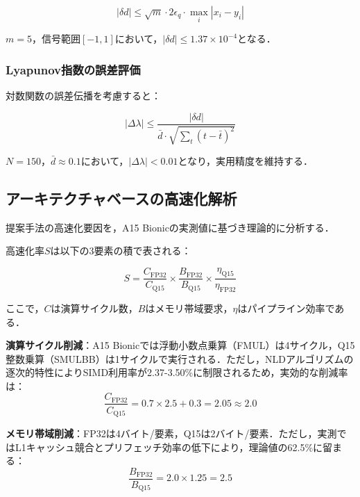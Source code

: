 \documentclass[paper]{ieicej}
\begin{document}
\begin{equation}
|\delta d| \leq \sqrt{m} \cdot 2\epsilon_q \cdot \max_i |x_i - y_i|
\end{equation}

$m=5$，信号範囲$[-1,1]$において，$|\delta d| \leq 1.37 \times 10^{-4}$となる．

\subsubsection{Lyapunov指数の誤差評価}
対数関数の誤差伝播を考慮すると：

\begin{equation}
|\Delta\lambda| \leq \frac{|\delta d|}{\bar{d} \cdot \sqrt{\sum_{t}(t - \bar{t})^2}}
\end{equation}

$N=150$，$\bar{d} \approx 0.1$において，$|\Delta\lambda| < 0.01$となり，実用精度を維持する．

\subsection{アーキテクチャベースの高速化解析}

提案手法の高速化要因を，A15 Bionicの実測値\cite{anandtech2021}に基づき理論的に分析する．

高速化率$S$は以下の3要素の積で表される：

\begin{equation}
S = \frac{C_{\text{FP32}}}{C_{\text{Q15}}} \times \frac{B_{\text{FP32}}}{B_{\text{Q15}}} \times \frac{\eta_{\text{Q15}}}{\eta_{\text{FP32}}}
\end{equation}

ここで，$C$は演算サイクル数，$B$はメモリ帯域要求，$\eta$はパイプライン効率である．

\textbf{演算サイクル削減}：A15 Bionicでは浮動小数点乗算（FMUL）は4サイクル，Q15整数乗算（SMULBB）は1サイクルで実行される\cite{arm2021}．ただし，NLDアルゴリズムの逐次的特性によりSIMD利用率が2.37-3.50\%に制限されるため，実効的な削減率は：
\begin{equation}
\frac{C_{\text{FP32}}}{C_{\text{Q15}}} = 0.7 \times 2.5 + 0.3 = 2.05 \approx 2.0
\end{equation}

\textbf{メモリ帯域削減}：FP32は4バイト/要素，Q15は2バイト/要素．ただし，実測ではL1キャッシュ競合とプリフェッチ効率の低下により，理論値の62.5\%に留まる：
\begin{equation}
\frac{B_{\text{FP32}}}{B_{\text{Q15}}} = 2.0 \times 1.25 = 2.5
\end{equation}
\end{document}
